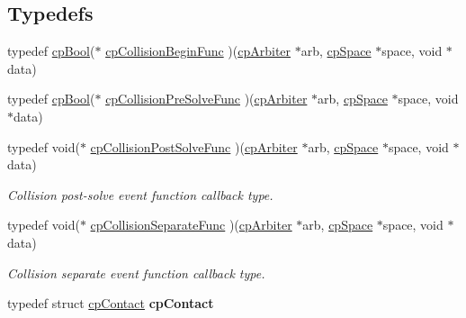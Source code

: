 \subsection*{Typedefs}
\begin{DoxyCompactItemize}
\item 
typedef \hyperlink{group__basic_types_gab6e5d8afee598a57cd323abae5310244}{cp\-Bool}($\ast$ \hyperlink{group__cp_arbiter_ga1abb3a86eb2889bf32349de4c8237612}{cp\-Collision\-Begin\-Func} )(\hyperlink{structcp_arbiter}{cp\-Arbiter} $\ast$arb, \hyperlink{structcp_space}{cp\-Space} $\ast$space, void $\ast$data)
\item 
typedef \hyperlink{group__basic_types_gab6e5d8afee598a57cd323abae5310244}{cp\-Bool}($\ast$ \hyperlink{group__cp_arbiter_ga00b9651732d9674c945334ed1968d19b}{cp\-Collision\-Pre\-Solve\-Func} )(\hyperlink{structcp_arbiter}{cp\-Arbiter} $\ast$arb, \hyperlink{structcp_space}{cp\-Space} $\ast$space, void $\ast$data)
\item 
\hypertarget{group__cp_arbiter_gaf66f0db756c55c5168b4956954af2f12}{typedef void($\ast$ \hyperlink{group__cp_arbiter_gaf66f0db756c55c5168b4956954af2f12}{cp\-Collision\-Post\-Solve\-Func} )(\hyperlink{structcp_arbiter}{cp\-Arbiter} $\ast$arb, \hyperlink{structcp_space}{cp\-Space} $\ast$space, void $\ast$data)}\label{group__cp_arbiter_gaf66f0db756c55c5168b4956954af2f12}

\begin{DoxyCompactList}\small\item\em Collision post-\/solve event function callback type. \end{DoxyCompactList}\item 
\hypertarget{group__cp_arbiter_ga70549bfa3ae4e806fa1afde420a71775}{typedef void($\ast$ \hyperlink{group__cp_arbiter_ga70549bfa3ae4e806fa1afde420a71775}{cp\-Collision\-Separate\-Func} )(\hyperlink{structcp_arbiter}{cp\-Arbiter} $\ast$arb, \hyperlink{structcp_space}{cp\-Space} $\ast$space, void $\ast$data)}\label{group__cp_arbiter_ga70549bfa3ae4e806fa1afde420a71775}

\begin{DoxyCompactList}\small\item\em Collision separate event function callback type. \end{DoxyCompactList}\item 
\hypertarget{group__cp_arbiter_gadeaf1b072720bc7dbf44daf9dee38aa3}{typedef struct \hyperlink{structcp_contact}{cp\-Contact} {\bfseries cp\-Contact}}\label{group__cp_arbiter_gadeaf1b072720bc7dbf44daf9dee38aa3}


\end{DoxyCompactItemize}
